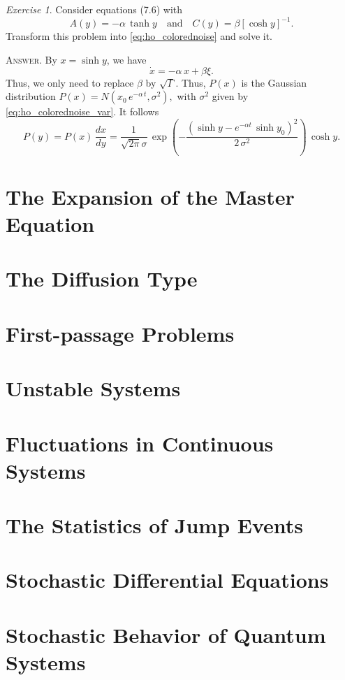 \documentclass{book}
\numberwithin{equation}{section}
\theoremstyle{plain}
\theoremstyle{definition}
\theoremstyle{remark}
\newtheorem{exercise}{Exercise}
\newcommand{\answer}[1]{{\color{DarkBlue}\footnotesize \textsc{Answer.} #1}}
\begin{document}
\begin{exercise}
  Consider equations (7.6) with
  $$
  A(y) = -\alpha \, \tanh y
  \quad \mathrm{and} \quad
  C(y) = \beta [ \cosh y ]^{-1}.
  $$
  Transform this problem into \eqref{eq:ho_colorednoise} and solve it.

  \answer{
    By $x = \sinh y$, we have
    $$
    \dot x = -\alpha \, x + \beta \xi.
    $$
    Thus, we only need to replace $\beta$ by $\sqrt\Gamma$.
    Thus, $P(x)$ is the Gaussian distribution
    $
    P(x) = N(x_0 \, e^{-\alpha \, t}, \sigma^2),
    $
    with $\sigma^2$ given by \eqref{eq:ho_colorednoise_var}.
    It follows
    $$
    P(y) = P(x) \, \frac{ dx }{ dy }
    = \frac{1}{\sqrt{2\pi} \sigma} \, \exp\left(
      -\frac{ (\sinh y - e^{-\alpha t} \, \sinh y_0)^2 } { 2 \, \sigma^2 }
    \right) \, \cosh y.
    $$
  }
\end{exercise}

\chapter{The Expansion of the Master Equation}

\chapter{The Diffusion Type}

\chapter{First-passage Problems}

\chapter{Unstable Systems}

\chapter{Fluctuations in Continuous Systems}

\chapter{The Statistics of Jump Events}

\chapter{Stochastic Differential Equations}

\chapter{Stochastic Behavior of Quantum Systems}



\end{document}

